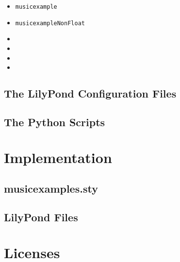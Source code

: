 \documentclass{OLLbook}
\begin{document}
\begin{itemize}
\item \texttt{musicexample}
\item \texttt{musicexampleNonFloat}
\item {}
\item {}
\item {}
\item {}
\end{itemize}

\section{The LilyPond Configuration Files}

\section{The Python Scripts}

\chapter{Implementation}

\section{musicexamples.sty}

\section{LilyPond Files}

\chapter{Licenses}

\end{document}
